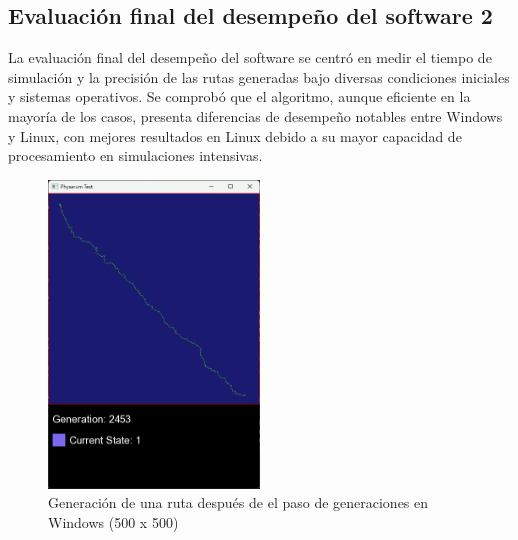 \subsection{Evaluaci\'on final del desempe\~no del software 2}
    La evaluaci\'on final del desempe\~no del software se centr\'o en
        medir el tiempo de simulaci\'on y la precisi\'on de las rutas
        generadas bajo diversas condiciones iniciales y sistemas
        operativos. Se comprob\'o que el algoritmo, aunque eficiente
        en la mayor\'ia de los casos, presenta diferencias de
        desempe\~no notables entre Windows y Linux, con mejores
        resultados en Linux debido a su mayor capacidad de
        procesamiento en simulaciones intensivas.
    \vskip 0.5cm
    \begin{figure}[htbp]
        \centering
        \includegraphics[width=0.5\textwidth]{./images/Pruebas/simulador/image085.png}
        \caption{Generaci\'on de una ruta despu\'es de el paso de generaciones en Windows (500 x 500)}
        \label{fig:Ruta 85}
    \end{figure}
    \vskip 0.5cm
